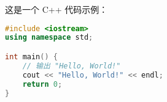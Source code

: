 \documentclass{article}
\begin{document}
这是一个 C++ 代码示例：

\begin{lstlisting}[language=C++, caption={C++ 代码示例}]
#include <iostream>
using namespace std;

int main() {
    // 输出 "Hello, World!"
    cout << "Hello, World!" << endl;
    return 0;
}
\end{lstlisting}
\end{document}
